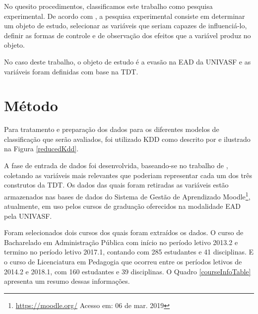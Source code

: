 No quesito procedimentos, classificamos este trabalho como pesquisa
experimental. De acordo com , a pesquisa
experimental consiste em determinar um objeto de estudo, selecionar as variáveis
que seriam capazes de influenciá-lo, definir as formas de controle e de
observação dos efeitos que a variável produz no objeto.

No caso deste trabalho, o objeto de estudo é a evasão na EAD da UNIVASF e as
variáveis foram definidas com base na TDT.

\section{Método}

Para tratamento e preparação dos dados para os diferentes modelos de
classificação que serão avaliados, foi utilizado KDD como descrito por
 e ilustrado na Figura \ref{reducedKdd}.


A fase de entrada de dados foi desenvolvida, baseando-se no trabalho de
, coletando as variáveis mais relevantes que
poderiam representar cada um dos três construtos da TDT. Os dados das quais
foram retiradas as variáveis estão armazenados nas bases de dados do Sistema de
Gestão de Aprendizado Moodle\footnote{\url{https://moodle.org/} Acesso em: 06 de
mar. 2019}, atualmente, em uso pelos cursos de graduação oferecidos na
modalidade EAD pela UNIVASF.

Foram selecionados dois cursos dos quais foram extraídos os dados. O curso de
Bacharelado em Administração Pública com início no período letivo 2013.2 e
termino no período letivo 2017.1, contando com 285 estudantes e 41 disciplinas.
E o curso de Licenciatura em Pedagogia que ocorreu entre os períodos letivos de
2014.2 e 2018.1, com 160 estudantes e 39 disciplinas. O Quadro
\ref{courseInfoTable} apresenta um resumo dessas informações.

